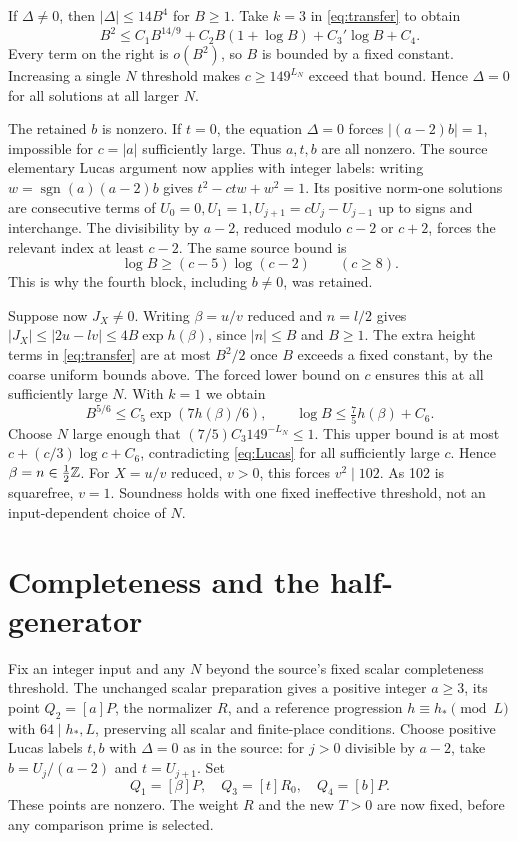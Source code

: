 \documentclass[11pt,a4paper]{article}
\begin{document}
If $\Delta\ne0$, then $|\Delta|\le14B^4$ for $B\ge1$.
Take $k=3$ in \eqref{eq:transfer} to obtain
\[
 B^2\le C_1B^{14/9}+C_2B(1+\log B)+C_3'\log B+C_4.
\]
Every term on the right is $o(B^2)$, so $B$ is bounded by a fixed
constant. Increasing a single $N$ threshold makes $c\ge149^{L_N}$
exceed that bound. Hence $\Delta=0$ for all solutions at all larger $N$.

The retained $b$ is nonzero. If $t=0$, the equation $\Delta=0$
forces $|(a-2)b|=1$, impossible for $c=|a|$ sufficiently large.
Thus $a,t,b$ are all nonzero. The source elementary Lucas argument
now applies with integer labels: writing $w=\operatorname{sgn}(a)(a-2)b$
gives $t^2-ctw+w^2=1$. Its positive norm-one solutions are consecutive
terms of $U_0=0,U_1=1,U_{j+1}=cU_j-U_{j-1}$ up to signs and
interchange. The divisibility by $a-2$, reduced modulo $c-2$ or $c+2$,
forces the relevant index at least $c-2$. The same source bound is
\begin{equation}\label{eq:Lucas}
                   \log B\ge(c-5)\log(c-2)\qquad(c\ge8).
\end{equation}
This is why the fourth block, including $b\ne0$, was retained.

Suppose now $J_X\ne0$. Writing $\beta=u/v$ reduced and $n=l/2$
gives
$|J_X|\le|2u-lv|\le4B\exp h(\beta)$, since $|n|\le B$ and
$B\ge1$. The extra height terms in \eqref{eq:transfer} are at most
$B^2/2$ once $B$ exceeds a fixed constant, by the coarse uniform
bounds above. The forced lower bound on $c$ ensures this at all
sufficiently large $N$. With $k=1$ we obtain
\[
 B^{5/6}\le C_5\exp(7h(\beta)/6),\qquad
 \log B\le\tfrac75h(\beta)+C_6.
\]
Choose $N$ large enough that $(7/5)C_3 149^{-L_N}\le1$.
This upper bound is at most
$c+(c/3)\log c+C_6$, contradicting \eqref{eq:Lucas} for all
sufficiently large $c$. Hence $\beta=n\in\tfrac12\mathbb Z$.
For $X=u/v$ reduced, $v>0$, this forces $v^2\mid102$.
As 102 is squarefree, $v=1$. Soundness holds with one fixed
ineffective threshold, not an input-dependent choice of $N$.

\section{Completeness and the half-generator}
Fix an integer input and any $N$ beyond the source's fixed scalar
completeness threshold. The unchanged scalar preparation gives a
positive integer $a\ge3$, its point $Q_2=[a]P$, the normalizer $R$,
and a reference progression $h\equiv h_*\pmod L$ with
$64\mid h_*,L$, preserving all scalar and finite-place conditions.
Choose positive Lucas labels $t,b$ with $\Delta=0$ as in the source:
for $j>0$ divisible by $a-2$, take $b=U_j/(a-2)$ and $t=U_{j+1}$.
Set
\[
 Q_1=[\beta]P,\quad Q_3=[t]R_0,\quad Q_4=[b]P.
\]
These points are nonzero. The weight $R$ and the new $T>0$ are now
fixed, before any comparison prime is selected.
\end{document}
